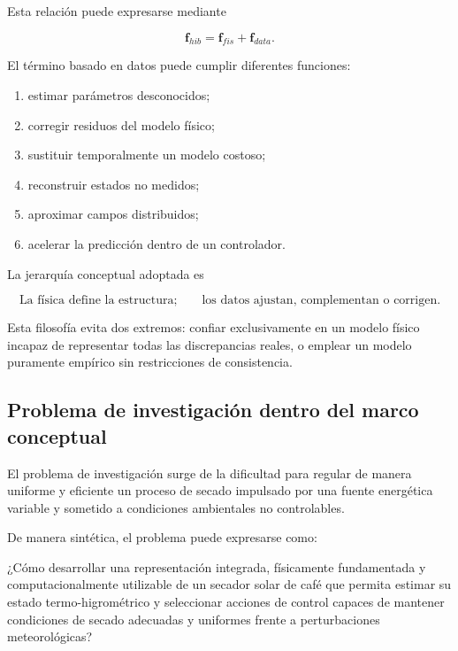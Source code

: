 Esta relación puede expresarse mediante

\begin{equation}
\boxed{
\mathbf{f}_{hib}
=
\mathbf{f}_{fis}
+
\mathbf{f}_{data}.
}
\label{eq:modelo_hibrido_conceptual}
\end{equation}

El término basado en datos puede cumplir diferentes funciones:

\begin{enumerate}
    \item estimar parámetros desconocidos;
    \item corregir residuos del modelo físico;
    \item sustituir temporalmente un modelo costoso;
    \item reconstruir estados no medidos;
    \item aproximar campos distribuidos;
    \item acelerar la predicción dentro de un controlador.
\end{enumerate}

La jerarquía conceptual adoptada es

\begin{equation}
\boxed{
\text{La física define la estructura;}
\qquad
\text{los datos ajustan, complementan o corrigen.}
}
\label{eq:filosofia_hibrida}
\end{equation}

Esta filosofía evita dos extremos: confiar exclusivamente en un modelo físico incapaz de representar todas las discrepancias reales, o emplear un modelo puramente empírico sin restricciones de consistencia.

\subsection{Problema de investigación dentro del marco conceptual}
\label{subsec:problema_marco_conceptual}

El problema de investigación surge de la dificultad para regular de manera uniforme y eficiente un proceso de secado impulsado por una fuente energética variable y sometido a condiciones ambientales no controlables.

De manera sintética, el problema puede expresarse como:

\begin{tcolorbox}[
title=Problema central de investigación,
colback=red!3,
colframe=red!55!black,
boxrule=0.8pt,
arc=2mm
]
¿Cómo desarrollar una representación integrada, físicamente fundamentada y computacionalmente utilizable de un secador solar de café que permita estimar su estado termo-higrométrico y seleccionar acciones de control capaces de mantener condiciones de secado adecuadas y uniformes frente a perturbaciones meteorológicas?
\end{tcolorbox}

